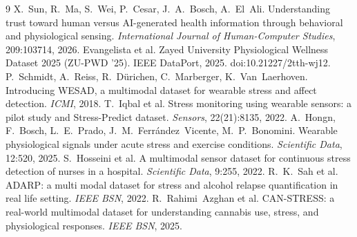 \documentclass{article}
\begin{document}
\begin{thebibliography}{9}
 X.~Sun, R.~Ma, S.~Wei, P.~Cesar, J.~A.~Bosch, A.~El~Ali. Understanding trust toward human versus AI-generated health information through behavioral and physiological sensing. \emph{International Journal of Human-Computer Studies}, 209:103714, 2026.
 Evangelista et al. Zayed University Physiological Wellness Dataset 2025 (ZU-PWD '25). IEEE DataPort, 2025. doi:10.21227/2tth-wj12.
 P.~Schmidt, A.~Reiss, R.~D\"urichen, C.~Marberger, K.~Van~Laerhoven. Introducing WESAD, a multimodal dataset for wearable stress and affect detection. \emph{ICMI}, 2018.
 T.~Iqbal et al. Stress monitoring using wearable sensors: a pilot study and Stress-Predict dataset. \emph{Sensors}, 22(21):8135, 2022.
 A.~Hongn, F.~Bosch, L.~E.~Prado, J.~M.~Ferr\'andez~Vicente, M.~P.~Bonomini. Wearable physiological signals under acute stress and exercise conditions. \emph{Scientific Data}, 12:520, 2025.
 S.~Hosseini et al. A multimodal sensor dataset for continuous stress detection of nurses in a hospital. \emph{Scientific Data}, 9:255, 2022.
 R.~K.~Sah et al. ADARP: a multi modal dataset for stress and alcohol relapse quantification in real life setting. \emph{IEEE BSN}, 2022.
 R.~Rahimi~Azghan et al. CAN-STRESS: a real-world multimodal dataset for understanding cannabis use, stress, and physiological responses. \emph{IEEE BSN}, 2025.
\end{thebibliography}
\end{document}
